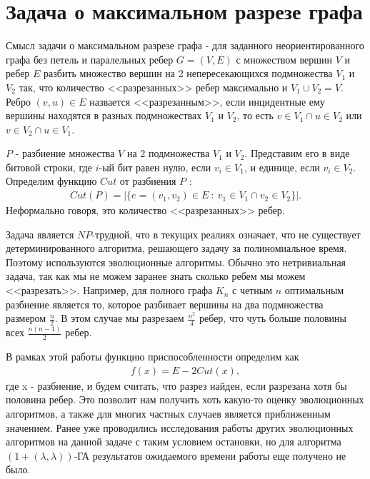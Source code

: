 \documentclass[times]{itmo-student-thesis}
\newcommand{\alglambdaf}{${(1 + (\lambda , \lambda))}$-ГА\xspace}
\begin{document}
\section{Задача о максимальном разрезе графа}

Смысл задачи о максимальном разрезе графа - для заданного неориентированного графа без петель и паралельных ребер $G = (V, E)$ с множеством вершин $V$ и ребер $E$ разбить множество вершин на 2 непересекающихся подмножества $V_1$ и $V_2$ так, что количество <<разрезанных>> ребер максимально и $V_1 \cup V_2 = V$.
Ребро $(v, u) \in E$ назвается <<разрезанным>>, если инцидентные ему вершины находятся в разных подмножествах $V_1$ и $V_2$, то есть $v \in V_1 \cap u \in V_2$ или $v \in V_2 \cap u \in V_1$.

$P$ - разбиение множества $V$ на 2 подмножества $V_1$ и $V_2$.
Представим его в виде битовой строки, где $i$-ый бит равен нулю, если $v_i \in V_1$, и единице, если $v_i \in V_2$.
Определим функцию  $Cut$ от разбиения $P$ :
\begin{align*}
   Cut(P) = |\{e = (v_1, v_2) \in E ~:~ v_1 \in V_1 \cap v_2 \in V_2\}|.
\end{align*}
Неформально говоря, это количество <<разрезанных>> ребер.

Задача является $NP$-трудной, что в текущих реалиях означает, что не существует детерминированного алгоритма, решающего задачу за полиномиальное время. Поэтому используются эволюционные алгоритмы.
Обычно это нетривиальная задача, так как мы не можем заранее знать сколько ребем мы можем <<разрезать>>. Например, для полного графа $K_n$ с четным $n$ оптимальным разбиение является то, которое разбивает вершины на два подмножества размером $\frac{n}{2}$. В этом случае мы разрезаем $\frac{n^2}{4}$ ребер, что чуть больше половины всех $\frac{n(n-1)}{2}$ ребер.

В рамках этой работы функцию приспособленности определим как
\begin{align*}
   f(x) = E - 2Cut(x),
\end{align*}
где x - разбиение, и будем считать, что разрез найден, если разрезана хотя бы половина ребер.
Это позволит нам получить хоть какую-то оценку эволюционных алгоритмов, а также для многих частных случаев является приближенным значением. Ранее уже проводились исследования работы других эволюционных алгоритмов на данной задаче с таким условием остановки, но для алгоритма \alglambdaf результатов ожидаемого времени работы еще получено не было.


\chapterconclusion
\end{document}
